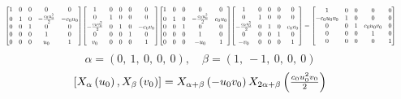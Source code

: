 \documentclass[11pt]{article}
\theoremstyle{definition}
\begin{document}
\[
\scaletoalign{\textwidth}{{\left[\begin{matrix}1 & 0 & 0 & 0 & 0\\0 & 1 & 0 & - \frac{c_{0} u_{0}^{2}}{2} & - c_{0} u_{0}\\0 & 0 & 1 & 0 & 0\\0 & 0 & 0 & 1 & 0\\0 & 0 & 0 & u_{0} & 1\end{matrix}\right]} {\left[\begin{matrix}1 & 0 & 0 & 0 & 0\\0 & 1 & 0 & 0 & 0\\- \frac{c_{0} v_{0}^{2}}{2} & 0 & 1 & 0 & - c_{0} v_{0}\\0 & 0 & 0 & 1 & 0\\v_{0} & 0 & 0 & 0 & 1\end{matrix}\right]} {\left[\begin{matrix}1 & 0 & 0 & 0 & 0\\0 & 1 & 0 & - \frac{c_{0} u_{0}^{2}}{2} & c_{0} u_{0}\\0 & 0 & 1 & 0 & 0\\0 & 0 & 0 & 1 & 0\\0 & 0 & 0 & - u_{0} & 1\end{matrix}\right]} {\left[\begin{matrix}1 & 0 & 0 & 0 & 0\\0 & 1 & 0 & 0 & 0\\- \frac{c_{0} v_{0}^{2}}{2} & 0 & 1 & 0 & c_{0} v_{0}\\0 & 0 & 0 & 1 & 0\\- v_{0} & 0 & 0 & 0 & 1\end{matrix}\right]} = {\left[\begin{matrix}1 & 0 & 0 & 0 & 0\\- c_{0} u_{0} v_{0} & 1 & 0 & 0 & 0\\0 & 0 & 1 & c_{0} u_{0} v_{0} & 0\\0 & 0 & 0 & 1 & 0\\0 & 0 & 0 & 0 & 1\end{matrix}\right]}}
\]
\[
\alpha = \left( 0, \  1, \  0, \  0, \  0\right), \quad \beta = \left( 1, \  -1, \  0, \  0, \  0\right)
\]
\[
\scaletoalign{\textwidth}{\left[ X_{\alpha}\left(u_{0}\right), X_{\beta}\left(v_{0}\right) \right] = X_{\alpha + \beta}\left(- u_{0} v_{0}\right) X_{2\alpha + \beta}\left(\frac{c_{0} u_{0}^{2} v_{0}}{2}\right)}
\]
\end{document}
